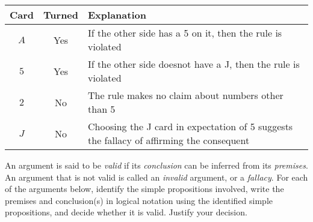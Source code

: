 \documentclass[addpoints]{exam}
\begin{document}
\begin{questions}
\begin{solution}
    \begin{tabularx}{\textwidth}{c|c|X}
      Card & Turned & Explanation \\\hline\hline
      $A$ & Yes & If the other side has a 5 on it, then the rule is violated \\\hline
      $5$ & Yes & If the other side doesnot have a J, then the rule is violated \\\hline
      $2$ & No & The rule makes no claim about numbers other than 5\\\hline
      $J$ & No & Choosing the J card in expectation of 5 suggests the fallacy of affirming the consequent
    \end{tabularx}
    
  \end{solution}
  
\question An argument is said to be \textit{valid} if its \textit{conclusion} can be inferred from its \textit{premises}. An argument that is not valid is called an \textit{invalid} argument, or a \textit{fallacy}. For each of the arguments below, identify the simple propositions involved, write the premises and conclusion(s) in logical notation using the identified simple propositions, and decide whether it is valid. Justify your decision.

\end{questions}
\end{document}
